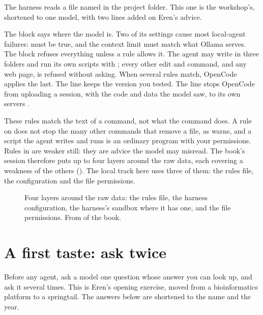 \documentclass[11pt,a4paper]{article}
\begin{document}
The harness reads a file named  in the project folder.
This one is the workshop's, shortened to one model, with two lines added on
Eren's advice.



The  block says where the model is. Two of its settings cause
most local-agent failures:  must be true, and the context
limit must match what Ollama serves. The  block refuses
everything unless a rule allows it. The agent may write in three folders and
run its own scripts with ; every other edit and command, and
any web page, is refused without asking. When several rules match, OpenCode
applies the last. The  line keeps the version you tested.
The  line stops OpenCode from uploading a session, with the code
and data the model saw, to its own servers
\parencite{eren2026agenticcoding}.

These rules match the text of a command, not what the command does. A rule
on  does not stop the many other commands that remove a file, as
\textcite{eren2026agenticcoding} warns, and a script the agent writes and
runs is an ordinary program with your permissions. Rules in
 are weaker still: they are advice the model may misread. The
book's session therefore puts up to four layers around the raw data, each
covering a weakness of the others (). The local track here
uses three of them: the rules file, the configuration and the file
permissions.

\begin{figure}[htbp]
\centering
{}
\caption{Four layers around the raw data: the rules file, the harness
configuration, the harness's sandbox where it has one, and the file
permissions. From \bkSession{} of the book.}
\label{fig:layers}
\end{figure}

\section{A first taste: ask twice}
\label{sec:taste}

Before any agent, ask a model one question whose answer you can look up, and
ask it several times. This is Eren's opening exercise, moved from a
bioinformatics platform to a springtail. The answers below are shortened to
the name and the year.
\end{document}
